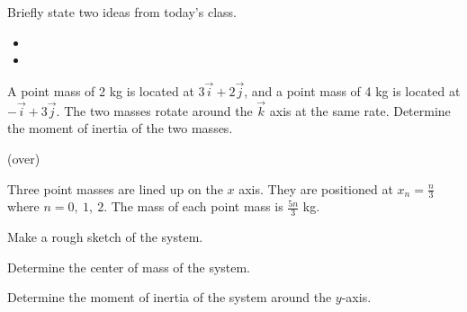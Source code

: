 \postClass

\begin{problem}
\item Briefly state two ideas from today's class.
  \begin{itemize}
  \item
  \item
  \end{itemize}
\item
  \begin{subproblem}
    \item
  \end{subproblem}
\end{problem}




\begin{problem}
\item A point mass of 2 kg is located at $3\vec{i} + 2\vec{j}$, and a
  point mass of 4 kg is located at $-\vec{i}+3\vec{j}$. The two masses
  rotate around the $\vec{k}$ axis at the same rate. Determine the
  moment of inertia of the two masses.

  \vfill

  (over)
  \clearpage


\item Three point masses are lined up on the $x$ axis. They are
  positioned at $x_n=\frac{n}{3}$ where $n=0,~1,~2$. The mass of each
  point mass is $\frac{5n}{3}$ kg.
  \begin{subproblem}
    \item Make a rough sketch of the system.
      \vfill
    \item Determine the center of mass of the system.
      \vfill
    \item Determine the moment of inertia of the system around the
      $y$-axis.
      \vfill
  \end{subproblem}


\end{problem}


